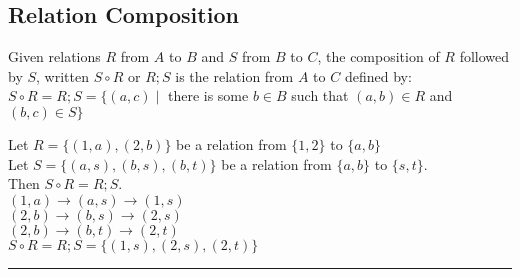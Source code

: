 \documentclass[../notes.tex]{subfiles}
\begin{document}
			\subsection{Relation Composition}
				Given relations $R$ from $A$ to $B$ and $S$ from $B$ to $C$, the composition of $R$ followed by $S$, written $S \circ R$ or $R;S$ is the relation from $A$ to $C$ defined by:\\
				$S \circ R = R;S = \bigl\{(a, c) \mid$ there is some $b \in B$ such that $(a, b) \in R$ and $(b, c) \in S\bigr\}$
				\begin{examplebox}
					Let $R = \bigl\{(1, a), (2, b)\bigr\}$ be a relation from $\{1, 2\}$ to $\{a, b\}$\\
					Let $S = \bigl\{(a, s), (b, s), (b, t)\bigr\}$ be a relation from $\{a, b\}$ to $\{s, t\}$.\\
					Then $S \circ R = R;S$.\\
					\-\hspace{1cm} $(1, a) \rightarrow (a, s) \rightarrow (1, s)$\\
					\-\hspace{1cm} $(2, b) \rightarrow (b, s) \rightarrow (2, s)$\\
					\-\hspace{1cm} $(2, b) \rightarrow (b, t) \rightarrow (2, t)$\\
					$S \circ R = R;S = \bigl\{(1, s), (2, s), (2, t)\bigr\}$
				\end{examplebox}
	\noindent\rule{\textwidth}{0.4pt}
\end{document}
